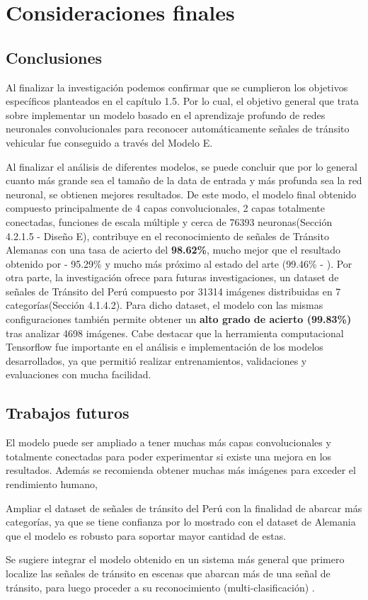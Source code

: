 \chapter{Consideraciones finales}
\setcounter{page}{132}
\renewcommand{\baselinestretch}{2} %
\textheight 21cm

\section{Conclusiones}

	Al finalizar la investigación podemos confirmar que se cumplieron los objetivos específicos planteados en el capítulo 1.5. Por lo cual, el objetivo general que trata sobre implementar un modelo basado en el aprendizaje profundo de redes neuronales convolucionales para reconocer automáticamente señales de tránsito vehicular fue conseguido a través del Modelo E.

	\vskip 0.2cm
	Al finalizar el análisis de diferentes modelos, se puede concluir que por lo general cuanto más grande sea el tamaño de la data de entrada y más profunda sea la red neuronal, se obtienen mejores resultados. De este modo, el modelo final obtenido compuesto principalmente de 4 capas convolucionales, 2 capas totalmente conectadas, funciones de escala múltiple y cerca de 76393 neuronas(Sección 4.2.1.5 - Diseño E), contribuye en el reconocimiento de señales de Tránsito Alemanas con una tasa de acierto del {\bf 98.62\%}, mucho mejor que el resultado obtenido por \citep{Ayuque2016} - 95.29\% y mucho más próximo al estado del arte (99.46\% - \citep{Ciresan}).
	\vskip 0.2cm
	Por otra parte, la investigación ofrece para futuras investigaciones, un dataset de señales de Tránsito del Perú compuesto por 31314 imágenes distribuidas en 7 categorías(Sección 4.1.4.2). Para dicho dataset, el modelo con las mismas configuraciones también permite obtener un {\bf alto grado de acierto (99.83\%)} tras analizar 4698 imágenes. 
	\vskip 0.2cm
	Cabe destacar que la herramienta computacional Tensorflow fue importante en el análisis e implementación de los modelos desarrollados, ya que permitió realizar entrenamientos, validaciones y evaluaciones con mucha facilidad. 


\section{Trabajos futuros}


	El modelo puede ser ampliado a tener muchas más capas convolucionales y totalmente conectadas para poder experimentar si existe una mejora en los resultados. Además se recomienda obtener muchas más imágenes para exceder el rendimiento humano, \citep{Goodfellow-et-al-2016}

	Ampliar el dataset de señales de tránsito del Perú con la finalidad de abarcar más categorías, ya que se tiene confianza por lo mostrado con el dataset de Alemania que el modelo es robusto para soportar mayor cantidad de estas.
	
	Se sugiere integrar el modelo obtenido en un sistema más general que primero localize las señales de tránsito en escenas que abarcan más de una señal de tránsito, para luego proceder a su reconocimiento (multi-clasificación) .
\newpage